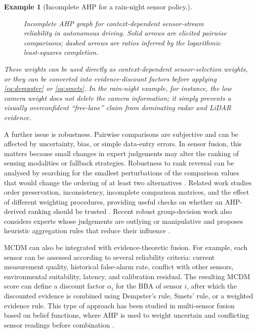\documentclass[11pt,oneside,openany]{book}
\newtheorem{example}{Example}[chapter]
\begin{document}
\begin{example}[Incomplete AHP for a rain-night sensor policy.]
\begin{figure}[t]
    \caption{Incomplete AHP graph for context-dependent sensor-stream reliability in autonomous driving. Solid arrows are elicited pairwise comparisons; dashed arrows are ratios inferred by the logarithmic least-squares completion.}
    \label{fig:incomplete-ahp-autonomous-driving-example}
\end{figure}

These weights can be used directly as context-dependent sensor-selection weights, or they can be converted into evidence-discount factors before applying \eqref{eq:dempster} or \eqref{eq:smets}. In the rain-night example, for instance, the low camera weight does not delete the camera information; it simply prevents a visually overconfident ``free-lane'' claim from dominating radar and LiDAR evidence. 
\end{example}
\smallskip

A further issue is robustness. Pairwise comparisons are subjective and can be affected by uncertainty, bias, or simple data-entry errors. In sensor fusion, this matters because small changes in expert judgements may alter the ranking of sensing modalities or fallback strategies. Robustness to rank reversal can be analysed by searching for the smallest perturbations of the comparison values that would change the ordering of at least two alternatives \cite{faramondi_robustness_2023}. Related work studies order preservation, inconsistency, incomplete comparison matrices, and the effect of different weighting procedures, providing useful checks on whether an AHP-derived ranking should be trusted \cite{kulakowski_orderpreservation_2015,agoston_csato_inconsistency_2022,csato_agoston_bozoki_2024}. Recent robust group-decision work also considers experts whose judgements are outlying or manipulative and proposes heuristic aggregation rules that reduce their influence \cite{kulakowski_resilient_2024}.

MCDM can also be integrated with evidence-theoretic fusion. For example, each sensor can be assessed according to several reliability criteria: current measurement quality, historical false-alarm rate, conflict with other sensors, environmental suitability, latency, and calibration residual. The resulting MCDM score can define a discount factor \(\alpha_i\) for the BBA of sensor \(i\), after which the discounted evidence is combined using Dempster's rule, Smets' rule, or a weighted evidence rule. This type of approach has been studied in multi-sensor fusion based on belief functions, where AHP is used to weight uncertain and conflicting sensor readings before combination \cite{frikha_ahp_2015}.
\end{document}
